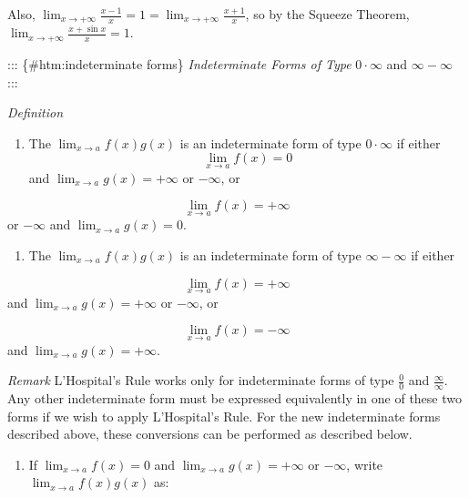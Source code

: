 \documentclass[
  letterpaper,
  DIV=11,
  numbers=noendperiod]{scrartcl}
\providecommand{\tightlist}{%
  \setlength{\itemsep}{0pt}\setlength{\parskip}{0pt}}\usepackage{longtable,booktabs,array}
\theoremstyle{plain}
\theoremstyle{remark}
\begin{document}
Also,
\(\displaystyle\lim_{x\to+\infty}{\frac{x-1}{x}=1=\displaystyle\lim_{x\to+\infty}{\frac{x+1}{x}}}\),
so by the Squeeze Theorem,
\(\displaystyle\lim_{x\to+\infty}{\frac{x+\sin x}{x}=1}\).

::: \{\#htm:indeterminate forms\} \emph{Indeterminate Forms of Type}
\(0\cdot \infty\) and \(\infty -\infty\) :::

\leavevmode{}%
\emph{Definition}

\begin{enumerate}
\def\labelenumi{\arabic{enumi}.}
\tightlist
\item
  The \(\displaystyle\lim_{x\to a}{f(x)g(x)}\) is an indeterminate form
  of type \(0\cdot \infty\) if either \[
  \displaystyle\lim_{x\to a}{f(x)=0}\] and
  \(\displaystyle\lim_{x\to a}{g(x)=+\infty}\) or \(-\infty\), or
\end{enumerate}

\[
\displaystyle\lim_{x\to a}{f(x)=+\infty}
\] or \(-\infty\) and \(\displaystyle\lim_{x\to a}{g(x)=0}\).

\begin{enumerate}
\def\labelenumi{\arabic{enumi}.}
\setcounter{enumi}{1}
\tightlist
\item
  The \(\displaystyle\lim_{x\to a}{f(x)g(x)}\) is an indeterminate form
  of type \(\infty - \infty\) if either
\end{enumerate}

\[
\displaystyle\lim_{x\to a}{f(x)=+\infty}
\] and \(\displaystyle\lim_{x\to a}{g(x)=+\infty}\) or \(-\infty\), or

\[
\displaystyle\lim_{x\to a}{f(x)=-\infty}
\] and \(\displaystyle\lim_{x\to a}{g(x)=+\infty}\).

\leavevmode{}%
\emph{Remark} L'Hospital's Rule works only for indeterminate forms of
type \(\frac{0}{0}\) and \(\frac{\infty}{\infty}\). Any other
indeterminate form must be expressed equivalently in one of these two
forms if we wish to apply L'Hospital's Rule. For the new indeterminate
forms described above, these conversions can be performed as described
below.

\begin{enumerate}
\def\labelenumi{\arabic{enumi}.}
\tightlist
\item
  If \(\displaystyle\lim_{x\to a}{f(x)=0}\) and
  \(\displaystyle\lim_{x\to a}{g(x)=+\infty}\) or \(-\infty\), write
  \(\displaystyle\lim_{x\to a}{f(x)g(x)}\) as:
\end{enumerate}
\end{document}
